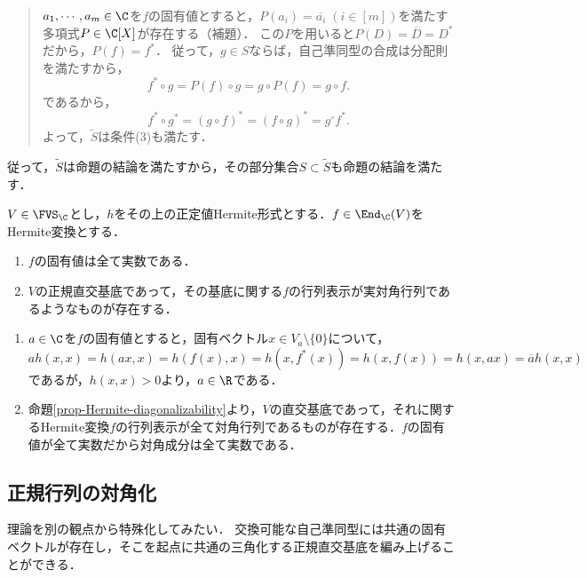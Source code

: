 \documentclass[uplatex, dvipdfmx]{jsreport}
\begin{document}
\begin{Proof}
\begin{description}
\begin{quotation}
            $a_1,\cdots,a_m\in\C$を$f$の固有値とすると，$P(a_i)=\overline{a_i}\;(i\in[m])$を満たす多項式$P\in\C[X]$が存在する（補題）．
            この$P$を用いると$P(D)=\overline{D}=D^*$だから，$P(f)=f^*$．
            従って，$g\in S$ならば，自己準同型の合成は分配則を満たすから，
            \[f^*\circ g=P(f)\circ g=g\circ P(f)=g\circ f.\]
            であるから，
            \[f^*\circ g^*=(g\circ f)^*=(f\circ g)^*=g^\circ f^*.\]
            よって，$\tilde{S}$は条件(3)も満たす．
        \end{quotation}
        従って，$\tilde{S}$は命題の結論を満たすから，その部分集合$S\subset\tilde{S}$も命題の結論を満たす．
    \end{description}
\end{Proof}


\begin{corollary}[Hermite変換の対角化]
    $V\in\FVS_\C$とし，$h$をその上の正定値Hermite形式とする．$f\in\End_\C(V)$をHermite変換とする．
    \begin{enumerate}
        \item $f$の固有値は全て実数である．
        \item $V$の正規直交基底であって，その基底に関する$f$の行列表示が実対角行列であるようなものが存在する．
    \end{enumerate}
\end{corollary}
\begin{Proof}\mbox{}
    \begin{enumerate}
        \item $a\in\C$を$f$の固有値とすると，固有ベクトル$x\in V_a\setminus\{0\}$について，$ah(x,x)=h(ax,x)=h(f(x),x)=h(x,f^*(x))=h(x,f(x))=h(x,ax)=\overline{a}h(x,x)$であるが，$h(x,x)>0$より，$a\in\R$である．
        \item 命題\ref{prop-Hermite-diagonalizability}より，$V$の直交基底であって，それに関するHermite変換$f$の行列表示が全て対角行列であるものが存在する．$f$の固有値が全て実数だから対角成分は全て実数である．
    \end{enumerate}
\end{Proof}

\subsection{正規行列の対角化}

\begin{tcolorbox}[colframe=ForestGreen, colback=ForestGreen!10!white,breakable,colbacktitle=ForestGreen!40!white,coltitle=black,fonttitle=\bfseries\sffamily,
title=]
    理論を別の観点から特殊化してみたい．
    交換可能な自己準同型には共通の固有ベクトルが存在し，そこを起点に共通の三角化する正規直交基底を編み上げることができる．
\end{tcolorbox}
\end{document}
